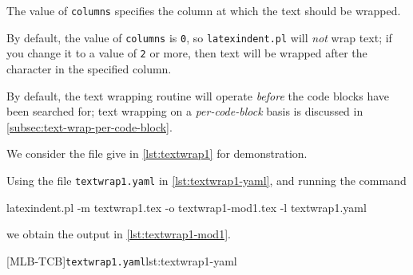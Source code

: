 	The value of \texttt{columns} specifies the column at which the text should be wrapped.

	By default, the value of \texttt{columns} is \texttt{0}, so \texttt{latexindent.pl} will
	\emph{not} wrap text; if you change it to a value of \texttt{2} or more, then text will
	be wrapped after the character in the specified column.

	By default, the text wrapping routine will operate \emph{before} the code blocks have
	been searched for; text wrapping on a \emph{per-code-block} basis is discussed in
	\cref{subsec:text-wrap-per-code-block}.

	We consider the file give in \cref{lst:textwrap1} for demonstration.

	\begin{widepage}
	\end{widepage}

	Using the file \texttt{textwrap1.yaml} in \cref{lst:textwrap1-yaml}, and running the
	command
	\begin{commandshell}
latexindent.pl -m textwrap1.tex -o textwrap1-mod1.tex -l textwrap1.yaml
\end{commandshell}
	we obtain the output in \cref{lst:textwrap1-mod1}.

	\begin{cmhtcbraster}[raster column skip=.1\linewidth]
		[MLB-TCB]{\texttt{textwrap1.yaml}}{lst:textwrap1-yaml}
	\end{cmhtcbraster}

